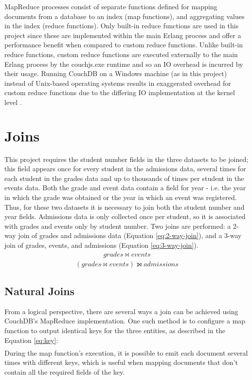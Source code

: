 MapReduce processes consist of separate functions defined for mapping documents from a database to an index (map functions), and aggregating values in the index (reduce functions). Only built-in reduce functions are used in this project since these are implemented within the main Erlang process and offer a performance benefit when compared to custom reduce functions. Unlike built-in reduce functions, custom reduce functions are executed externally to the main Erlang process by the couchjs.exe runtime and so  an IO overhead is incurred by their usage. Running CouchDB on a Windows machine (as in this project) instead of Unix-based operating systems results in exaggerated overhead for custom reduce functions due to the differing IO implementation at the kernel level \cite{slack1Nov}.

\section{Joins}
This project requires the student number fields in the three datasets to be joined; this field appears once for every student in the admissions data, several times for each student in the grades data and up to thousands of times per student in the events data. Both the grade and event data contain a field for year - i.e. the year in which the grade was obtained or the year in which an event was registered. Thus, for these two datasets it is necessary to join both the student number and year fields. Admissions data is only collected once per student, so it is associated with grades and events only by student number. Two joins are performed: a 2-way join of grades and admissions data (Equation \ref{eq:2-way-join}), and a 3-way join of grades, events, and admissions (Equation \ref{eq:3-way-join}).
\begin{align}
    grades \bowtie events\label{eq:2-way-join}
\end{align}
\begin{align}
    (grades \bowtie events) \leftouterjoin admissions\label{eq:3-way-join}
\end{align}

\subsection{Natural Joins}
From a logical perspective, there are several ways a join can be achieved using CouchDB's MapReduce implementation. One such method is to configure a map function to output identical keys for the three entities, as described in the Equation \ref{eq:key}:
\begin{align}
    [studentNumber,course,year]\label{eq:key}
\end{align}
During the map function’s execution, it is possible to emit each document several times with different keys, which is useful when mapping documents that don't contain all the required fields of the key.


